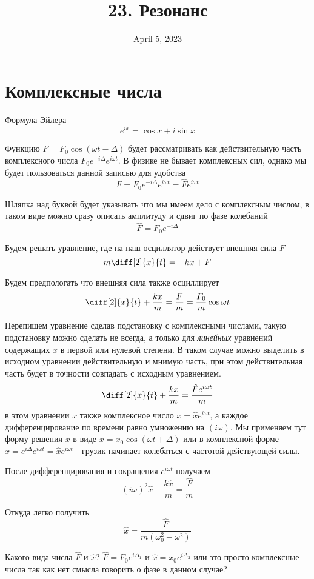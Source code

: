 \documentclass[12pt]{article}
\date{April 5, 2023}
\title{23. Резонанс}
\begin{document}
\maketitle

\section{Комплексные числа}

Формула Эйлера
\[
    e^{ix}=\cos x+i\sin x
\]

Функцию $F=F_0 \cos(\omega t-\Delta)$ будет рассматривать как действительную часть комплексного числа $F_0 e^{-i \Delta} e^{i \omega t}$. В физике не бывает комплексных сил, однако мы будет пользоваться данной записью для удобства
\[
    F=F_0 e^{-i \Delta} e^{i \omega t} = \hat{F} e^{i \omega t}
\]

Шляпка над буквой будет указывать что мы имеем дело с комплексным числом, в таком виде можно сразу описать амплитуду и сдвиг по фазе колебаний
\[
    \hat{F}=F_0 e^{-i \Delta}
\]

Будем решать уравнение, где на наш осциллятор действует внешняя сила $F$
\[
    m\diff[2]{x}{t}=-kx + F
\]

Будем предпологать что внешняя сила также осциллирует
\[
    \diff[2]{x}{t}+\frac{kx}{m}=\frac{F}{m}=\frac{F_0}{m} \cos\omega t
\]

\newpage

Перепишем уравнение сделав подстановку с комплексными числами, такую подстановку можно сделать не всегда, а только для \textit{линейных} уравнений содержащих $x$ в первой или нулевой степени. В таком случае можно выделить в исходном уравнении действительную и мнимую часть, при этом действительная часть будет в точности совпадать с исходным уравнением.
\[
    \diff[2]{x}{t}+\frac{kx}{m}=\frac{\hat{F} e^{i \omega t}}{m}
\]
в этом уравнении $x$ также комплексное число $x=\hat{x} e^{i \omega t}$, а каждое дифференцирование по времени равно умножению на $(i \omega)$. Мы применяем тут форму решения $x$ в виде $x=x_0\cos(\omega t+\Delta)$ или в комплексной форме $x=e^{i \Delta} e^{i \omega t} = \hat{x} e^{i \omega t}$ - грузик начинает колебаться с частотой действующей силы.

После дифференцирования и сокращения $e^{i \omega t}$ получаем
\[
    (i \omega)^2 \hat{x} + \frac{k\hat{x}}{m} = \frac{\hat{F}}{m}
\]

Откуда легко получить
\[
    \hat{x} = \frac{\hat{F}}{m(\omega_0^2-\omega^2)}
\]

Какого вида числа $\hat{F}$ и $\hat{x}$? $\hat{F}=F_0 e^{i \Delta_1}$ и $\hat{x}=x_0 e^{i \Delta_2}$ или это просто комплексные числа так как нет смысла говорить о фазе в данном случае?
\end{document}
